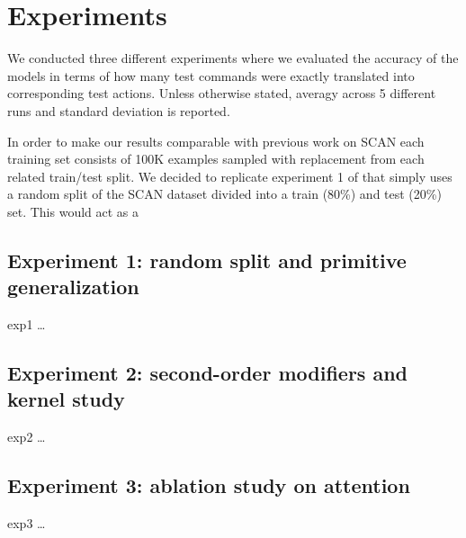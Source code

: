 \section{Experiments}
\label{sec:intro}

We conducted three different experiments where we evaluated the accuracy of the models in terms of how many test commands were exactly translated
into corresponding test actions. Unless otherwise stated, averagy across 5 different runs and standard deviation is reported.

In order to make our results comparable with previous work on SCAN each training set consists of 100K examples sampled with replacement
from each related train/test split. We decided to replicate experiment 1 of \cite{Lake:Baroni:2017} that simply uses a random split
of the SCAN dataset divided into a train (80\%) and test (20\%) set. This would act as a 

\subsection{Experiment 1: random split and primitive generalization}
\label{subsec:exp1}

exp1 \dots

\subsection{Experiment 2: second-order modifiers and kernel study}
\label{subsec:exp2}

exp2 \dots

\subsection{Experiment 3: ablation study on attention}
\label{subsec:exp3}

exp3 \dots


